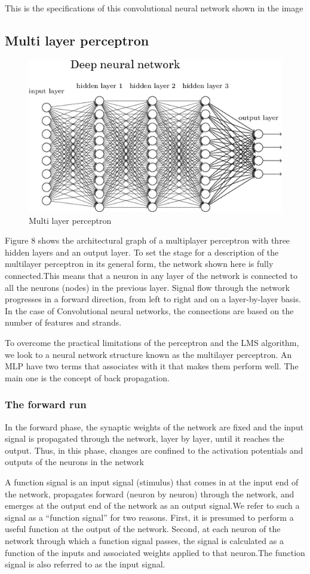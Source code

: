 \documentclass[12pt]{article}
\begin{document}
     This is the specifications of this convolutional neural network shown in the image
     \subsection{Multi layer perceptron}
     \begin{figure}[h]
    	\centering
    	\includegraphics[width=0.55 \textwidth]{h.png}
    	\caption{Multi layer perceptron}
    	\label{fig:mesh7}
    	
	\end{figure}   
     
     
     Figure 8 shows the architectural graph of a multiplayer perceptron with three hidden
layers and an output layer. To set the stage for a description of the multilayer perceptron
in its general form, the network shown here is fully connected.This means that a neuron
in any layer of the network is connected to all the neurons (nodes) in the previous
layer. Signal flow through the network progresses in a forward direction, from left to right
and on a layer-by-layer basis. In the case of Convolutional neural networks, the connections are based on the number of features and strands. 

To overcome
the practical limitations of the perceptron and the LMS algorithm, we look to a neural
network structure known as the multilayer perceptron. An MLP have two terms that associates with it that makes them perform well. The main one is the concept of back propagation.
    \subsubsection{The forward run}
    In the forward phase, the synaptic weights of the network are fixed and the input signal is propagated through the network, layer by layer, until it reaches the output.
Thus, in this phase, changes are confined to the activation potentials and outputs of the neurons in the network

A function signal is an input signal (stimulus) that comes in at the input end of the network, propagates forward (neuron by neuron) through the network, and emerges at the output end of the network as an output signal.We refer to such a signal as a “function signal” for two reasons. First, it is presumed to
perform a useful function at the output of the network. Second, at each neuron of the network through which a function signal passes, the signal is calculated as a function of the inputs and associated weights applied to that neuron.The function signal is also referred to as the input signal.
\end{document}
